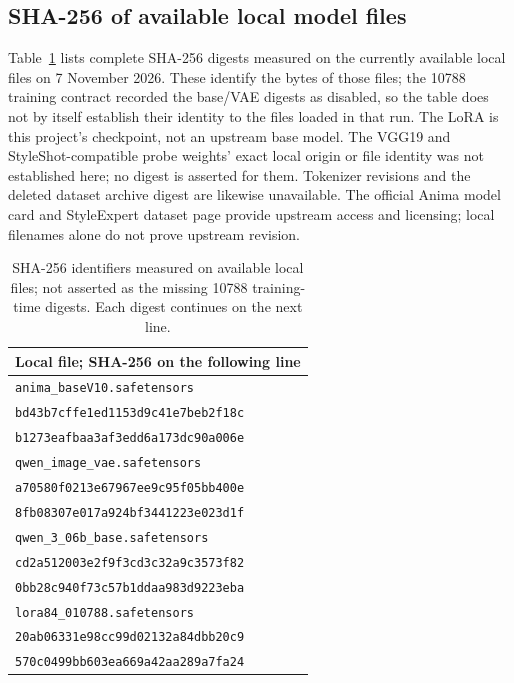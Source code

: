 \documentclass[10pt,letterpaper]{article}
\begin{document}
\subsection{SHA-256 of available local model files}
Table~\ref{tab:model-digests} lists complete SHA-256 digests measured on the currently available local files on 7 November 2026. These identify the bytes of those files; the 10788 training contract recorded the base/VAE digests as disabled, so the table does not by itself establish their identity to the files loaded in that run. The LoRA is this project's checkpoint, not an upstream base model. The VGG19 and StyleShot-compatible probe weights' exact local origin or file identity was not established here; no digest is asserted for them. Tokenizer revisions and the deleted dataset archive digest are likewise unavailable. The official Anima model card and StyleExpert dataset page provide upstream access and licensing; local filenames alone do not prove upstream revision.
\begin{table}[H]
\centering
\caption{SHA-256 identifiers measured on available local files; not asserted as the missing 10788 training-time digests. Each digest continues on the next line.}
\label{tab:model-digests}
\footnotesize
\setlength{\tabcolsep}{0pt}
\begin{tabular}{l}
\toprule
Local file; SHA-256 on the following line \\
\midrule
\texttt{anima\_baseV10.safetensors} \\
\texttt{bd43b7cffe1ed1153d9c41e7beb2f18c} \\
\texttt{b1273eafbaa3af3edd6a173dc90a006e} \\
\texttt{qwen\_image\_vae.safetensors} \\
\texttt{a70580f0213e67967ee9c95f05bb400e} \\
\texttt{8fb08307e017a924bf3441223e023d1f} \\
\texttt{qwen\_3\_06b\_base.safetensors} \\
\texttt{cd2a512003e2f9f3cd3c32a9c3573f82} \\
\texttt{0bb28c940f73c57b1ddaa983d9223eba} \\
\texttt{lora84\_010788.safetensors} \\
\texttt{20ab06331e98cc99d02132a84dbb20c9} \\
\texttt{570c0499bb603ea669a42aa289a7fa24} \\
\bottomrule
\end{tabular}
\end{table}
\end{document}
